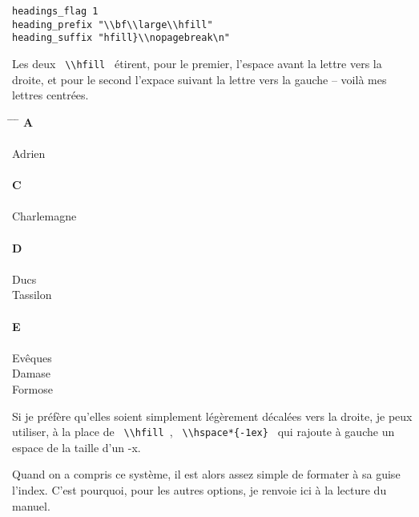 \begin{verbatim}
headings_flag 1
heading_prefix "\\bf\\large\\hfill" 
heading_suffix "hfill}\\nopagebreak\n" 
\end{verbatim}

Les deux \verb| \\hfill | étirent, pour le premier, l'espace avant la lettre vers la droite, et pour le second l'expace suivant la lettre vers la gauche -- voilà mes lettres centrées.

\begin{tabbing}
\hspace{0,5cm}  \= \hspace{1cm} \= \hspace{1,5cm} \= \kill
\>\> \large{\textbf{A}}\\
\\
Adrien\>\> \\
\\
\>\> \large{\textbf{C}}\\
\\
Charlemagne \>\> \\
\\
\>\> \large{\textbf{D}}\\
\\
Ducs \\
\> Tassilon\>\\
\\
\>\> \large{\textbf{E}}\\
\\
Evêques \\
\> Damase \>\\
\> Formose\>\\

\end{tabbing}


Si je préfère qu'elles soient simplement légèrement décalées vers la droite, je peux utiliser, à la place de \verb| \\hfill |, \verb| \\hspace*{-1ex} |  qui rajoute à gauche un espace de la taille d'un -x. 


Quand on a compris ce système, il est alors assez simple de formater à sa guise l'index. C'est pourquoi, pour les autres options, je renvoie ici à la lecture du manuel.



